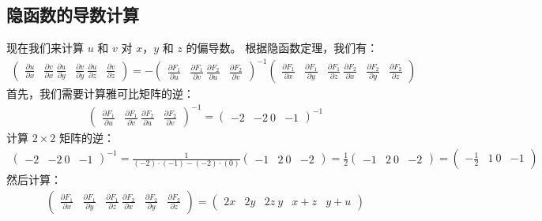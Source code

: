\documentclass{ctexart}  %
\begin{document}
\subsection {隐函数的导数计算}
现在我们来计算 \(u\) 和 \(v\) 对 \(x\)，\(y\) 和 \(z\) 的偏导数。
根据隐函数定理，我们有：
\begin{align}
\begin{pmatrix}
\frac{\partial u}{\partial x} & \frac{\partial v}{\partial x} \
\frac{\partial u}{\partial y} & \frac{\partial v}{\partial y} \
\frac{\partial u}{\partial z} & \frac{\partial v}{\partial z}
\end{pmatrix}
= -
\begin{pmatrix}
\frac{\partial F_1}{\partial u} & \frac{\partial F_1}{\partial v} \
\frac{\partial F_2}{\partial u} & \frac{\partial F_2}{\partial v}
\end{pmatrix}^{-1}
\begin{pmatrix}
\frac{\partial F_1}{\partial x} & \frac{\partial F_1}{\partial y} & \frac{\partial F_1}{\partial z} \
\frac{\partial F_2}{\partial x} & \frac{\partial F_2}{\partial y} & \frac{\partial F_2}{\partial z}
\end{pmatrix}
\end{align}
首先，我们需要计算雅可比矩阵的逆：
\begin {align}
\begin {pmatrix}
\frac {\partial F_1}{\partial u} & \frac {\partial F_1}{\partial v} \
\frac {\partial F_2}{\partial u} & \frac {\partial F_2}{\partial v}
\end {pmatrix}^{-1}
= \begin {pmatrix}
-2 & -2 \
0 & -1
\end {pmatrix}^{-1}
\end {align}
计算 \(2 \times 2\) 矩阵的逆：
\begin {align}
\begin {pmatrix}
-2 & -2 \
0 & -1
\end {pmatrix}^{-1}
= \frac {1}{(-2) \cdot (-1) - (-2) \cdot (0)}
\begin {pmatrix}
-1 & 2 \
0 & -2
\end {pmatrix}
= \frac {1}{2}
\begin {pmatrix}
-1 & 2 \
0 & -2
\end {pmatrix}
= \begin {pmatrix}
-\frac {1}{2} & 1 \
0 & -1
\end {pmatrix}
\end {align}
然后计算：
\begin {align}
\begin {pmatrix}
\frac {\partial F_1}{\partial x} & \frac {\partial F_1}{\partial y} & \frac {\partial F_1}{\partial z} \
\frac {\partial F_2}{\partial x} & \frac {\partial F_2}{\partial y} & \frac {\partial F_2}{\partial z}
\end {pmatrix}
= \begin {pmatrix}
2x & 2y & 2z \
y & x + z & y + u
\end {pmatrix}
\end {align}
\end{document}
